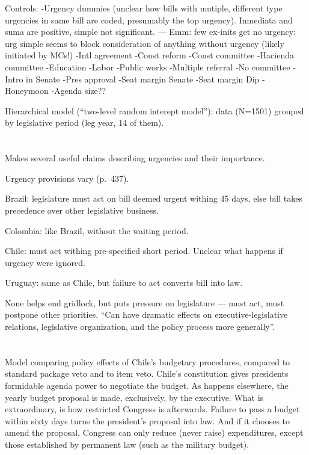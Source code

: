 \documentclass[letter,12pt]{article}
\begin{document}
Controls: 
-Urgency dummies (unclear how bills with mutiple, different type urgencies in same bill are coded, presumably the top urgency). Inmediata and suma are positive, simple not significant. --- Emm: few ex-inits get no urgency: urg simple seems to block consideration of anything without urgency (likely initiated by MCs!) 
-Intl agreement
-Const reform
-Const committee
-Hacienda committee
-Education
-Labor
-Public works
-Multiple referral
-No committee
-Intro in Senate
-Pres approval
-Seat margin Senate
-Seat margin Dip
-Honeymoon
-Agenda size??

Hierarchical model (``two-level random interept model''): data (N=1501) grouped by legislative period (leg year, 14 of them). 

\section{\citet{morgenstern.2002b}}

Makes several useful claims describing urgencies and their importance. 

Urgency provisions vary (p.\ 437). 

Brazil: legislature must act on bill deemed urgent withing 45 days, else bill takes precedence over other legislative business. 

Colombia: like Brazil, without the waiting period. 

Chile: must act withing pre-specified short period. Unclear what happens if urgency were ignored. 

Uruguay: same as Chile, but failure to act converts bill into law. 

None helps end gridlock, but puts pressure on legislature --- must act, must postpone other priorities. ``Can have dramatic effects on executive-legislative relations, legislative organization, and the policy process more generally''. 

\section{\citet{baldez.carey.1999}}

Model comparing policy effects of Chile's budgetary procedures, compared to standard package veto and to item veto. Chile's constitution gives presidents formidable agenda power to negotiate the budget. As happens elsewhere, the yearly budget proposal is made, exclusively, by the executive. What is extraordinary, is how restricted Congress is afterwards. Failure to pass a budget within sixty days turns the president's proposal into law. And if it chooses to amend the proposal, Congress can only reduce (never raise) expenditures, except those established by permanent law (such as the military budget). 
\end{document}
